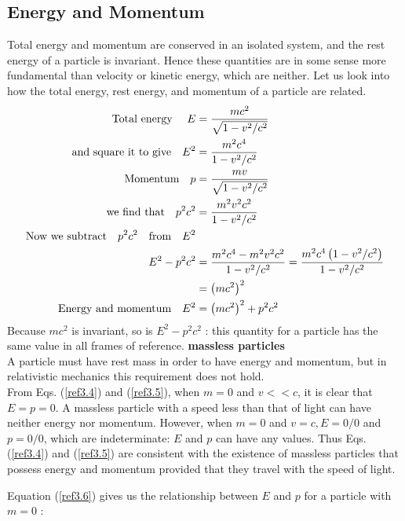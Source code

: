  \subsection{Energy and Momentum}
 Total energy and momentum are conserved in an isolated system, and the rest energy of a particle is invariant. Hence these quantities are in some sense more fundamental than velocity or kinetic energy, which are neither. Let us look into how the total energy, rest energy, and momentum of a particle are related.
 \begin{align}
  \text { Total energy } \quad
 E&=\frac{m c^{2}}{\sqrt{1-v^{2} / c^{2}}} \label{ref3.4}\\
 \text{ and square it to give} \quad
 E^{2}&=\frac{m^{2} c^{4}}{1-v^{2} / c^{2}}\notag\\
\text{Momentum} \quad p&=\frac{m v}{\sqrt{1-v^{2} / c^{2}}} \label{ref3.5}\\
\text{we find that} \quad p^{2} c^{2}&=\frac{m^{2} v^{2} c^{2}}{1-v^{2} / c^{2}} \notag\\
\text{Now we subtract} \quad p^{2} c^{2}\quad  \text{from} \quad E^{2} \notag \\
E^{2}-p^{2} c^{2} &=\frac{m^{2} c^{4}-m^{2} v^{2} c^{2}}{1-v^{2} / c^{2}}=\frac{m^{2} c^{4}\left(1-v^{2} / c^{2}\right)}{1-v^{2} / c^{2}} \notag \\
&=\left(m c^{2}\right)^{2}\notag\\
\text{Energy and momentum} \quad
E^{2}&=\left(m c^{2}\right)^{2}+p^{2} c^{2} \label{ref3.6}
 \end{align}
  Because $m c^{2}$ is invariant, so is $E^{2}-p^{2} c^{2}$ : this quantity for a particle has the same value in all frames of reference.
\textbf{massless particles}\\
 A particle must have rest mass in order to have energy and momentum, but in relativistic mechanics this requirement does not hold.\\
 From Eqs. (\ref{ref3.4}) and (\ref{ref3.5}), when $m=0$ and $v<< c$, it is clear that $E=p=0$. A massless particle with a speed less than that of light can have neither energy nor momentum. However, when $m=0$ and $v=c, E=0 / 0$ and $p=0 / 0$, which are indeterminate: $E$ and $p$ can have any values. Thus Eqs. (\ref{ref3.4}) and (\ref{ref3.5}) are consistent with the existence of massless particles that possess energy and momentum provided that they travel with the speed of light.
 
 Equation (\ref{ref3.6}) gives us the relationship between $E$ and $p$ for a particle with $m=0$ :\\
 
